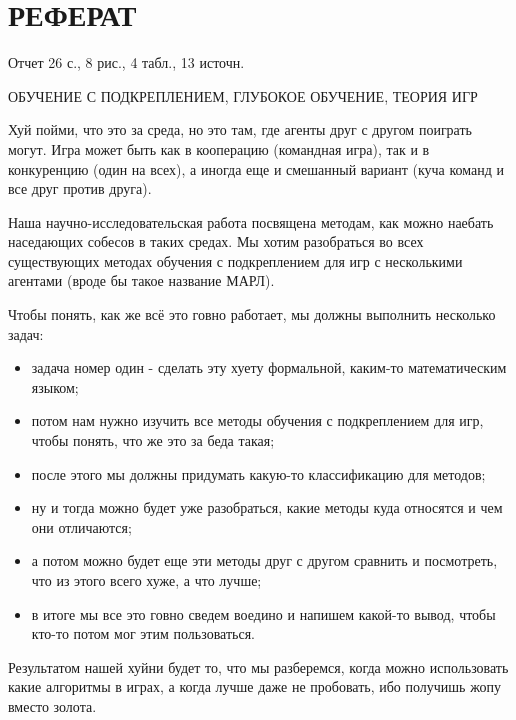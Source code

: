 \section*{\large РЕФЕРАТ}

Отчет 26 с., 8 рис., 4 табл., 13 источн. 

ОБУЧЕНИЕ С ПОДКРЕПЛЕНИЕМ, ГЛУБОКОЕ ОБУЧЕНИЕ, ТЕОРИЯ ИГР

Хуй пойми, что это за среда, но это там, где агенты друг с другом поиграть могут. Игра может быть как в кооперацию (командная игра), так и в конкуренцию (один на всех), а иногда еще и смешанный вариант (куча команд и все друг против друга).

Наша научно-исследовательская работа посвящена методам, как можно наебать наседающих собесов в таких средах. Мы хотим разобраться во всех существующих методах обучения с подкреплением для игр с несколькими агентами (вроде бы такое название МАРЛ).

Чтобы понять, как же всё это говно работает, мы должны выполнить несколько задач:
\begin{itemize}[label=---]
\item задача номер один - сделать эту хуету формальной, каким-то математическим языком;
\item потом нам нужно изучить все методы обучения с подкреплением для игр, чтобы понять, что же это за беда такая;
\item после этого мы должны придумать какую-то классификацию для методов;
\item ну и тогда можно будет уже разобраться, какие методы куда относятся и чем они отличаются;
\item а потом можно будет еще эти методы друг с другом сравнить и посмотреть, что из этого всего хуже, а что лучше;
\item в итоге мы все это говно сведем воедино и напишем какой-то вывод, чтобы кто-то потом мог этим пользоваться.
\end{itemize}

Результатом нашей хуйни будет то, что мы разберемся, когда можно использовать какие алгоритмы в играх, а когда лучше даже не пробовать, ибо получишь жопу вместо золота.

